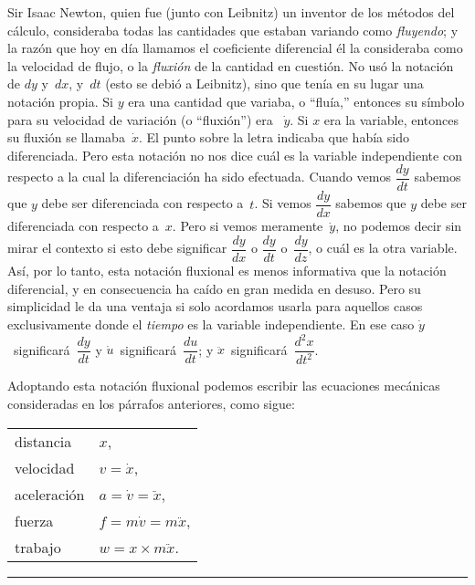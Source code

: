 \documentclass[12pt]{book}[2005/09/16]
\newcommand{\DPPageSep}[2]{\Pagelabel{#2}}
\newcommand{\Pagelabel}[1]
  {\phantomsection\label{#1}}
\newcommand{\tb}[1][1.5in]{%
  \pagebreak[0]\par{\centering\rule{#1}{0.5pt}\pagebreak[3]\par}%
}
\newcommand{\DPtypo}[2]{#2}%
\newcommand{\DPnote}[1]{}%
\begin{document}
Sir Isaac Newton, quien fue (junto con Leibnitz)\DPnote{** [sic], not Leibniz}
un inventor de los métodos del cálculo, consideraba
todas las cantidades que estaban variando como \emph{fluyendo}; y la
razón que hoy en día llamamos el coeficiente diferencial
él la consideraba como la velocidad de flujo, o la
\emph{fluxión} de la cantidad en cuestión. No usó
la notación de $dy$ y~$dx$, y~$dt$ (esto se debió
a Leibnitz), sino que tenía en su lugar una notación propia.
Si $y$ era una cantidad que variaba, o ``fluía,'' entonces su
símbolo para su velocidad de variación (o ``fluxión'') era~%
\DPPageSep{071.png}{59}%
$\dot{y}$. Si $x$ era la variable, entonces su fluxión se llamaba~$\dot{x}$.
El punto sobre la letra indicaba que había sido
diferenciada. Pero esta notación no nos dice
cuál es la variable independiente con respecto a
la cual la diferenciación ha sido efectuada. Cuando
vemos $\dfrac{dy}{dt}$ sabemos que $y$ debe ser diferenciada con
respecto a~$t$. Si vemos $\dfrac{dy}{dx}$ sabemos que $y$ debe ser
diferenciada con respecto a~$x$. Pero si vemos meramente~$\dot{y}$,
no podemos decir sin mirar el contexto
si esto debe significar $\dfrac{dy}{dx}$ o $\dfrac{dy}{dt}$ o~$\dfrac{dy}{dz}$, o cuál es
la otra variable. Así, por lo tanto, esta notación fluxional
es menos informativa que la notación diferencial,
y en consecuencia ha caído en gran medida en desuso.
Pero su simplicidad le da una ventaja si solo
acordamos usarla para aquellos casos exclusivamente donde
el \emph{tiempo} es la variable independiente. En ese caso $\dot{y}$~significará~$\dfrac{dy}{dt}$ y $\dot{u}$~significará~$\dfrac{du}{dt}$;
y $\ddot{x}$~significará~$\dfrac{d^2x}{dt^2}$.

Adoptando esta notación fluxional podemos escribir las
ecuaciones mecánicas consideradas en los párrafos
anteriores, como sigue:
\begin{center}
\begin{tabular}{l@{\qquad\qquad}l}
distancia    &  $x$\DPtypo{}{,} \\
velocidad    &  $v = \dot{x}$, \\
aceleración  &  $a = \dot{v} = \ddot{x}$, \\
fuerza       &  $f = m\dot{v} = m\ddot{x}$, \\
trabajo      &  $w = x × m \ddot{x}$.
\end{tabular}
\end{center}

\tb
\DPPageSep{072.png}{60}%
\end{document}
